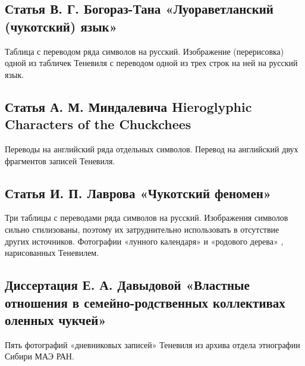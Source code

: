 \documentclass{article}
\newcounter{glyph}
\def\allchars{}
\begin{document}
\subsection{Статья В. Г. Богораз-Тана «Луораветланский (чукотский) язык»}

Таблица с переводом ряда символов на русский. Изображение (перерисовка) одной из табличек Теневиля с переводом одной из трех строк на ней на русский язык.

\subsection{Статья А. М. Миндалевича Hieroglyphic Characters of the Chuckchees}

Переводы на английский ряда отдельных символов. Перевод на английский двух фрагментов записей Теневиля.

\subsection{Статья И. П. Лаврова «Чукотский феномен»}

Три таблицы с переводами ряда символов на русский. Изображения символов сильно стилизованы, поэтому их затруднительно использовать в отсутствие других источников. Фотографии «лунного календаря» и «родового дерева» , нарисованных Теневилем.

\subsection{Диссертация Е. А. Давыдовой «Властные отношения в семейно-родственных коллективах оленных чукчей»}

Пять фотографий «дневниковых записей» Теневиля из архива отдела этнографии Сибири МАЭ РАН.

\printbibliography

\end{document}
